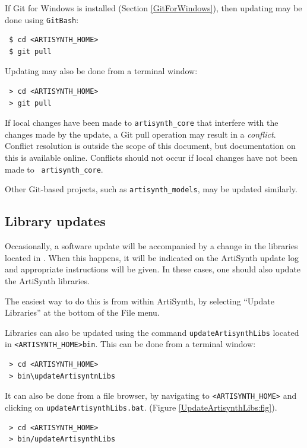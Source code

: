 \ifWindows
If Git for Windows is installed (Section \ref{GitForWindows}),
then updating may be done using {\tt GitBash}:
\begin{verbatim}
 $ cd <ARTISYNTH_HOME>
 $ git pull
\end{verbatim}
\else %
Updating may also be done from a terminal window: 
\begin{verbatim}
 > cd <ARTISYNTH_HOME>
 > git pull
\end{verbatim}
\fi %

\begin{sideblock}
If local changes have been made to {\tt artisynth\_core} that
interfere with the changes made by the update, a Git pull operation
may result in a {\it conflict}.  Conflict resolution is outside the
scope of this document, but documentation on this is available online.
Conflicts should not occur if local changes have not been made to {\tt
artisynth\_core}.
\end{sideblock}

Other Git-based projects, such as {\tt artisynth\_models}, may be
updated similarly.

\subsection{Library updates}

Occasionally, a software update will be accompanied by a change in the
libraries located in .  When this happens, it will
be indicated on the ArtiSynth update log and appropriate instructions
will be given. In these cases, one should also update the ArtiSynth
libraries. 

The easiest way to do this is from within ArtiSynth, by selecting
{\sf ``Update Libraries''} at the bottom of the {\sf File} menu.

Libraries can
also be updated using the command {\tt updateArtisynthLibs} located in
{\tt <ARTISYNTH\_HOME>\SEP bin}. This can be done from a terminal
window:
\ifWindows
\begin{verbatim}
 > cd <ARTISYNTH_HOME>
 > bin\updateArtisyntnLibs
\end{verbatim}
It can also be done from a file browser, by navigating
to {\tt <ARTISYNTH\_HOME>} and clicking on {\tt updateArtisynthLibs.bat}.
(Figure \ref{UpdateArtisynthLibs:fig}).
\else
\begin{verbatim}
 > cd <ARTISYNTH_HOME>
 > bin/updateArtisynthLibs
\end{verbatim}
\fi

